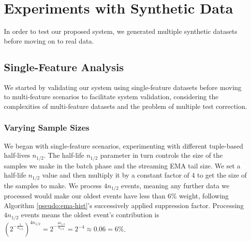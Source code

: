 \documentclass[sigconf]{acmart}
\begin{document}
\iffalse
\section{Experiments with Synthetic Data}
\label{sec:SyntheticExperiments}
In order to test our proposed system, we generated multiple synthetic datasets before moving on to real data.

\subsection{Single-Feature Analysis}
We started by validating our system using single-feature datasets before moving to multi-feature scenarios to facilitate system validation, considering the complexities of multi-feature datasets and the problem of multiple test correction.

\subsubsection{Varying Sample Sizes}
We began with single-feature scenarios, experimenting with different tuple-based half-lives $n_{1/2}$. The half-life $n_{1/2}$ parameter in turn controls the size of the samples we make in the batch phase and the streaming EMA tail size. We set a half-life $n_{1/2}$ value and then multiply it by a constant factor of 4 to get the size of the samples to make. We process $4n_{1/2}$ events, meaning any further data we processed would make our oldest events have less than 6\% weight, following Algorithm \ref{pseudo:ema-hist}'s successively applied suppression factor. Processing $4n_{1/2}$ events means the oldest event's contribution is $({2^{- \frac{1}{n_{1/2}}}})^{4n_{1/2}} = {2^{- \frac{4n_{1/2}}{n_{1/2}}}} = 2^{-4} \approx 0.06 = 6\%$. 
\end{document}

